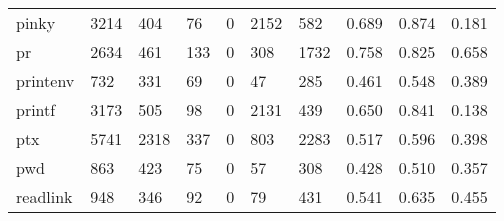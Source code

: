 \begin{longtable}{lp{2.0cm}p{2.0cm}p{2.0cm}p{2.0cm}p{2.0cm}p{2.0cm}p{2.0cm}p{2.0cm}p{2.0cm}}
pinky     &                   3214 &                                404 &                                76 &                                0 &                              2152 &                             582 &                                0.689 &                                  0.874 &                                0.181 \\
pr        &                   2634 &                                461 &                               133 &                                0 &                               308 &                            1732 &                                0.758 &                                  0.825 &                                0.658 \\
printenv  &                    732 &                                331 &                                69 &                                0 &                                47 &                             285 &                                0.461 &                                  0.548 &                                0.389 \\
printf    &                   3173 &                                505 &                                98 &                                0 &                              2131 &                             439 &                                0.650 &                                  0.841 &                                0.138 \\
ptx       &                   5741 &                               2318 &                               337 &                                0 &                               803 &                            2283 &                                0.517 &                                  0.596 &                                0.398 \\
pwd       &                    863 &                                423 &                                75 &                                0 &                                57 &                             308 &                                0.428 &                                  0.510 &                                0.357 \\
readlink  &                    948 &                                346 &                                92 &                                0 &                                79 &                             431 &                                0.541 &                                  0.635 &                                0.455 \\

\end{longtable}
